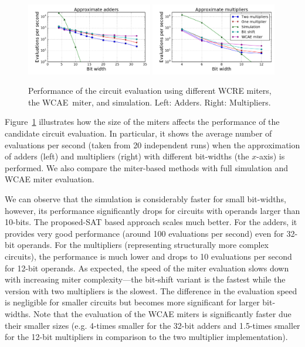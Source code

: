 \documentclass[runningheads]{llncs}
\begin{document}
\begin{figure}[t]
    \centering
    \includegraphics[width=0.49\textwidth]{img/prezentace/addApprox_log.pdf}
    \includegraphics[width=0.49\textwidth]{img/prezentace/multApprox_log.pdf}
    \vspace{-1em}
    \caption{Performance of  the circuit evaluation using different WCRE miters,
    the WCAE~miter, and simulation. Left: Adders. Right: Multipliers.}  
    \label{fig:evals}
    \vspace{-1em}
\end{figure}

Figure~\ref{fig:evals} illustrates how the size of the miters affects the
performance of the candidate circuit evaluation. In particular, it shows the
average number of evaluations per second (taken from 20 independent runs) when
the approximation of adders (left) and multipliers (right) with different
bit-widths (the  $x$-axis) is performed. We also compare the miter-based methods
with full simulation and WCAE miter evaluation.

We can observe that the simulation is considerably faster for small bit-widths,
however, its performance  significantly drops for circuits with operands larger
than 10-bits. The proposed-SAT based approach scales much better. For the
adders, it provides very good performance (around 100 evaluations per second)
even for 32-bit operands. For the multipliers (representing structurally more
complex circuits), the performance is much lower and drops to 10 evaluations per
second for 12-bit operands. As expected, the speed of the miter evaluation slows
down with increasing miter complexity---the bit-shift variant is the fastest
while the version with two multipliers is the slowest. The difference in the
evaluation speed is negligible for smaller circuits but becomes more significant
for larger bit-widths. Note that the evaluation of the WCAE miters is
significantly faster due their smaller sizes (e.g. 4-times smaller for the
32-bit adders and 1.5-times smaller for the 12-bit multipliers in comparison to
the two multiplier implementation).
\end{document}
